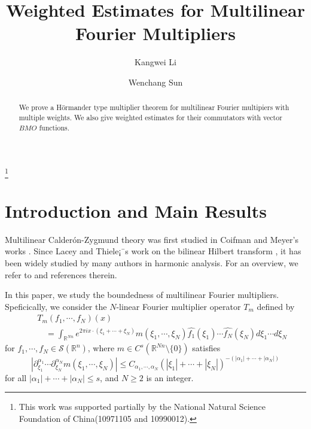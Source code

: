 \documentclass[11pt,oneside,onecolumn]{amsart}
\numberwithin{equation}{section}
\begin{document}
\title{Weighted Estimates for Multilinear Fourier Multipliers}
\thanks{This work was supported partially by the
National Natural Science Foundation of China(10971105 and 10990012).}

\author{Kangwei Li}

\address{School of Mathematical Sciences and LPMC,  Nankai University,
      Tianjin~300071, China}

\author{Wenchang Sun}


\address{School of Mathematical Sciences and LPMC,  Nankai University,
      Tianjin~300071, China}

\begin{abstract}
We prove a H\"{o}rmander  type multiplier theorem for
multilinear Fourier multipiers with multiple weights.
We also
give   weighted estimates for their commutators with vector $BMO$ functions.
\end{abstract}

\maketitle

\section{Introduction and Main Results}
Multilinear Calder\'on-Zygmund theory was first studied in Coifman and Meyer's works \cite{CM,CM1}.
 Since Lacey and Thiele¡¯s work on the bilinear Hilbert transform \cite{LT1,LT2}, it
has been widely studied by many authors in harmonic analysis.
For an overview, we refer to \cite{DLY,DGY,DGGLY,GLY,GT,HY1,HY2,MW,YYZ} and references therein.

In this paper, we study the boundedness of multilinear Fourier multipliers.
Speficically, we consider the $N$-linear Fourier multiplier operator $T_m$ defined by
\begin{eqnarray*}
&&T_m(f_1,\cdots,f_N)(x)\\
&&\quad=\int_{{\mathbb{R}}^{Nn}}e^{2\pi ix\cdot(\xi_1+\cdots+\xi_N)}m(\xi_1,\cdots,\xi_N)\widehat{f_1}(\xi_1)\cdots \widehat{f_N}(\xi_N)d\xi_1\cdots d\xi_N
\end{eqnarray*}
for $f_1,\cdots,f_N\in \mathscr{S}({\mathbb{R}}^n)$, where
$m\in C^s({\mathbb{R}}^{Nn}\setminus \{0\})$ satisfies
\begin{equation}\label{eq:e1}
|\partial^{\alpha_1}_{\xi_1}\cdots \partial^{\alpha_N}_{\xi_N}m(\xi_1,\cdots,\xi_N)|
\le
C_{\alpha_1,\cdots,\alpha_N}(|\xi_1|+\cdots+|\xi_N|)^{-(|\alpha_1|+\cdots+|\alpha_N|)}
\end{equation}
for all $|\alpha_1|+\cdots+|\alpha_N|\le s$, and $N\ge 2$ is an integer.
\end{document}
